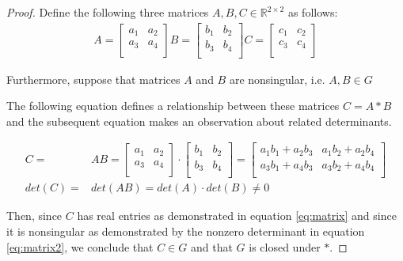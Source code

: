 \documentclass[12pt]{article}
\newcommand{\reals}{\mathbb{R}}
\begin{document}
\begin{proof}

Define the following three matrices $A,B,C \in \reals^{2 \times 2}$ as follows:
\begin{align} \label{eq:matrix_defs}
	A = \begin{bmatrix} a_1 & a_2 \\ a_3 & a_4 \\ \end{bmatrix}
	B = \begin{bmatrix} b_1 & b_2 \\ b_3 & b_4 \\ \end{bmatrix}
	C = \begin{bmatrix} c_1 & c_2 \\ c_3 & c_4 \\ \end{bmatrix}
\end{align}

Furthermore, suppose that matrices $A$ and $B$ are nonsingular, i.e. $A,B \in G$

The following equation defines a relationship between these matrices $C = A * B$ and the subsequent equation makes an observation about related determinants.

\begin{align} \label{eq:matrix}
	C = & AB =
	\begin{bmatrix} a_1 & a_2 \\ a_3 & a_4 \\ \end{bmatrix}
	\cdot
	\begin{bmatrix} b_1 & b_2 \\ b_3 & b_4 \\ \end{bmatrix}
	=
	\begin{bmatrix} a_1 b_1 + a_2 b_3 & a_1 b_2 + a_2 b_4 \\ a_3 b_1 + a_4 b_3 & a_3 b_2 + a_4 b_4 \\ \end{bmatrix} \\ \label{eq:matrix2}
	det(C) = &
	det(AB) = det(A) \cdot det(B) \neq 0
\end{align}

Then, since $C$ has real entries as demonstrated in equation \ref{eq:matrix} and since it is nonsingular as demonstrated by the nonzero determinant in equation \ref{eq:matrix2}, we conclude that $C \in G$ and that $G$ is closed under $*$.


\end{proof}
\end{document}
